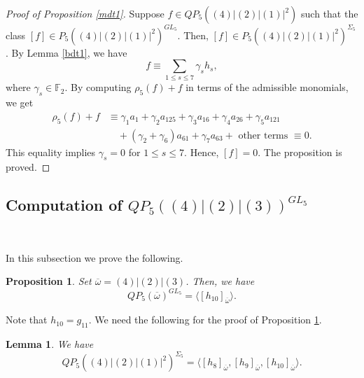 \documentclass[reqno]{amsart}
\theoremstyle{plain}
\theoremstyle{definition}
\theoremstyle{plain}
\newtheorem{props}[thms]{Proposition}
\newtheorem{lems}[thms]{Lemma}
\theoremstyle{definition}
\numberwithin{equation}{section}
\begin{document}
\begin{proof}[Proof of Proposition \ref{mdt1}] Suppose $f \in QP_5((4)|(2)|(1)|^2)$ such that the class $[f] \in P_5((4)|(2)|(1)|^2)^{GL_5}$. Then, $[f] \in P_5((4)|(2)|(1)|^2)^{\Sigma_5}$. By Lemma \ref{bdt1}, we have 
$$ f \equiv \sum_{1 \leqslant s \leqslant 7}\gamma_sh_s,$$
where $\gamma_s \in \mathbb F_2$. By computing $\rho_5(f)+f$ in terms of the admissible monomials, we get
\begin{align*}
\rho_5(f)+f &\equiv \gamma_1a_1 + \gamma_2a_{125}+ \gamma_3a_{16} + \gamma_4a_{26} + \gamma_5a_{121}\\
&\quad + (\gamma_2 + \gamma_6)a_{61} + \gamma_7a_{63} + \mbox{ other terms } \equiv 0.
\end{align*}
This equality implies $\gamma_s = 0$ for $1 \leqslant s \leqslant 7$. Hence, $[f] = 0$. The proposition is proved.
\end{proof}

\subsection{Computation of $QP_5((4)|(2)|(3))^{GL_5}$}\

\smallskip
In this subsection we prove the following.

\begin{props}\label{mdt2} Set $\overline{\omega} = (4)|(2)|(3)$. Then, we have 
$$QP_5(\overline{\omega})^{GL_5} = \langle [h_{10}]_{\overline{\omega}}\rangle.$$
\end{props}
Note that $h_{10} = g_{11}$. We need the following for the proof of Proposition \ref{mdt2}.

\begin{lems}\label{bdt2} We have 
$$QP_5((4)|(2)|(1)|^2)^{\Sigma_5} = \langle [h_8]_{\overline{\omega}}, [h_9]_{\overline{\omega}}, [h_{10}]_{\overline{\omega}}\rangle. $$
\end{lems}
\end{document}
